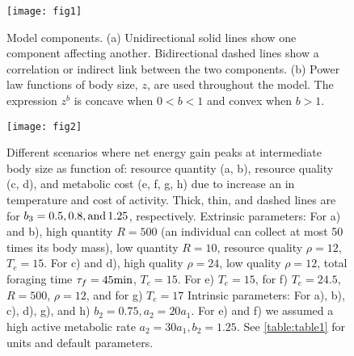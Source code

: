 \clearpage

\begin{figure}[H]
\begin{center}
\texttt{[image: fig1]}
\caption{
    \setstretch{\stretchby}
    Model components.
    (a) Unidirectional solid lines show one component affecting another.
    Bidirectional dashed lines show a correlation or indirect link between the two components.
    (b) Power law functions of body size, $z$, are used throughout the model.
    The expression $z^b$ is concave when $0 < b < 1$ and convex when $b > 1$.
}
\label{fig1}
\end{center}
\end{figure}

\clearpage

\begin{figure}[H]
\begin{center}
\texttt{[image: fig2]}
\caption{
    \setstretch{\stretchby}
	Different scenarios where net energy gain peaks at intermediate body size as function of: resource quantity (a, b), resource quality (c, d), and metabolic cost (e, f, g, h) due to increase an in temperature and cost of activity.
	Thick, thin, and dashed lines are for $b_3 = 0.5, 0.8, \rm{ and }\, 1.25$, respectively.
	Extrinsic parameters:
	For a) and b), high quantity $R = 500$ (an individual can collect at most 50 times its body mass), low quantity $R= 10$, resource quality $\rho = 12$, $T_e = 15$.
	For c) and d), high quality $\rho = 24$, low quality $\rho = 12$, total foraging time $\tau_f = 45 \rm{min}$, $T_e = 15$.
	For e) $T_e = 15$, for f) $T_e = 24.5$, $R = 500$, $\rho = 12$, and for g) $T_e = 17$
	Intrinsic parameters:
	For a), b), c), d), g), and h) $b_2 = 0.75, a_2 = 20 a_1$.
	For e) and f) we assumed a high active metabolic rate $a_2 = 30 a_1, b_2  = 1.25$.
	See \cref{table:table1} for units and default parameters.
}
\label{fig2}
\end{center}
\end{figure}

